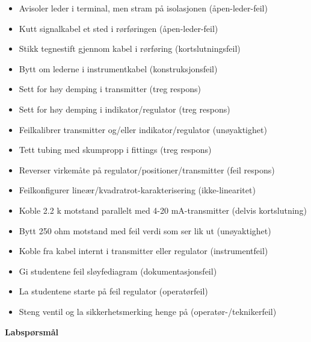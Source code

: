 \begin{itemize}
\goodbreak
\item{} Avisoler leder i terminal, men stram på isolasjonen (åpen-leder-feil)
\item{} Kutt signalkabel et sted i rørføringen (åpen-leder-feil)
\item{} Stikk tegnestift gjennom kabel i rørføring (kortslutningsfeil)
\item{} Bytt om lederne i instrumentkabel (konstruksjonsfeil)
\item{} Sett for høy demping i transmitter (treg respons)
\item{} Sett for høy demping i indikator/regulator (treg respons)
\item{} Feilkalibrer transmitter og/eller indikator/regulator (unøyaktighet)
\item{} Tett tubing med skumpropp i fittings (treg respons)
\item{} Reverser virkemåte på regulator/positioner/transmitter (feil respons)
\item{} Feilkonfigurer lineær/kvadratrot-karakterisering (ikke-linearitet)
\item{} Koble 2.2 k motstand parallelt med 4-20 mA-transmitter (delvis kortslutning)
\item{} Bytt 250 ohm motstand med feil verdi som ser lik ut (unøyaktighet)
\item{} Koble fra kabel internt i transmitter eller regulator (instrumentfeil)
\item{} Gi studentene feil sløyfediagram (dokumentasjonsfeil)
\item{} La studentene starte på feil regulator (operatørfeil)
\item{} Steng ventil og la sikkerhetsmerking henge på (operatør-/teknikerfeil)
\end{itemize}










\vfil \eject

\noindent
{\bf Labspørsmål}

\vskip 20pt

